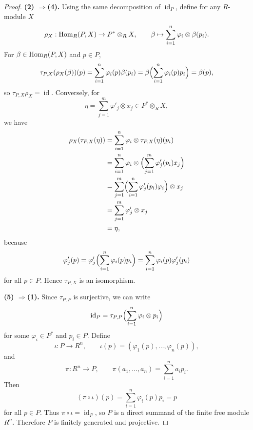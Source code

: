 \begin{proof}
    \textbf{(2) $\Longrightarrow$(4).}
    Using the same decomposition of $\operatorname{id}_P$, define for any $R$-module $X$\[
        \rho_X:\mathrm{Hom}_R(P,X)\to P^*\otimes_R X,\qquad
        \beta\mapsto \sum_{i=1}^n \varphi_i\otimes \beta(p_i).
    \]
    For $\beta\in \mathrm{Hom}_R(P,X)$ and $p\in P$,
    \[
        \tau_{P,X}(\rho_X(\beta))(p)
        =
        \sum_{i=1}^n \varphi_i(p)\beta(p_i)
        =
        \beta\Bigl(\sum_{i=1}^n \varphi_i(p)p_i\Bigr)
        =
        \beta(p),
    \]
    so $\tau_{P,X}\rho_X=\operatorname{id}$.
    Conversely, for
    \[
        \eta=\sum_{j=1}^m \varphi'_j\otimes x_j\in P^*\otimes_R X,
    \]
    we have
    \begin{align*}
        \rho_X(\tau_{P,X}(\eta))
         & =\sum_{i=1}^n \varphi_i\otimes \tau_{P,X}(\eta)(p_i)                       \\
         & =\sum_{i=1}^n \varphi_i\otimes \Bigl(\sum_{j=1}^m \varphi'_j(p_i)x_j\Bigr) \\
         & =\sum_{j=1}^m \Bigl(\sum_{i=1}^n \varphi'_j(p_i)\varphi_i\Bigr)\otimes x_j \\
         & =\sum_{j=1}^m \varphi'_j\otimes x_j                                        \\
         & =\eta,
    \end{align*}
    because
    \[
        \varphi'_j(p)=\varphi'_j\Bigl(\sum_{i=1}^n \varphi_i(p)p_i\Bigr)
        =
        \sum_{i=1}^n \varphi_i(p)\varphi'_j(p_i)
    \]
    for all $p\in P$. Hence $\tau_{P,X}$ is an isomorphism.

    \textbf{(5) $\Longrightarrow$(1).}
    Since $\tau_{P,P}$ is surjective, we can write
    \[
        \operatorname{id}_P=\tau_{P,P}\Bigl(\sum_{i=1}^n \varphi_i\otimes p_i\Bigr)
    \]
    for some $\varphi_i\in P^*$ and $p_i\in P$. Define
    \[
        \iota:P\to R^n,\qquad \iota(p)=(\varphi_1(p),\dots,\varphi_n(p)),
    \]
    and
    \[
        \pi:R^n\to P,\qquad \pi(a_1,\dots,a_n)=\sum_{i=1}^n a_i p_i.
    \]
    Then
    \[
        (\pi\circ \iota)(p)=\sum_{i=1}^n \varphi_i(p)p_i=p
    \]
    for all $p\in P$. Thus $\pi\circ \iota=\operatorname{id}_P$, so $P$ is a direct summand of
    the finite free module $R^n$. Therefore $P$ is finitely generated and projective.
\end{proof}

